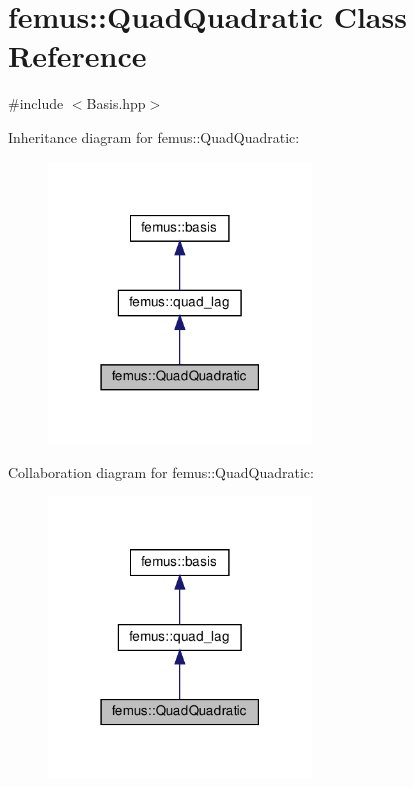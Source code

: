 \hypertarget{classfemus_1_1_quad_quadratic}{}\section{femus\+:\+:Quad\+Quadratic Class Reference}
\label{classfemus_1_1_quad_quadratic}


{\ttfamily \#include $<$Basis.\+hpp$>$}



Inheritance diagram for femus\+:\+:Quad\+Quadratic\+:
\nopagebreak
\begin{figure}[H]
\begin{center}
\leavevmode
\includegraphics[width=198pt]{classfemus_1_1_quad_quadratic__inherit__graph}
\end{center}
\end{figure}


Collaboration diagram for femus\+:\+:Quad\+Quadratic\+:
\nopagebreak
\begin{figure}[H]
\begin{center}
\leavevmode
\includegraphics[width=198pt]{classfemus_1_1_quad_quadratic__coll__graph}
\end{center}
\end{figure}

